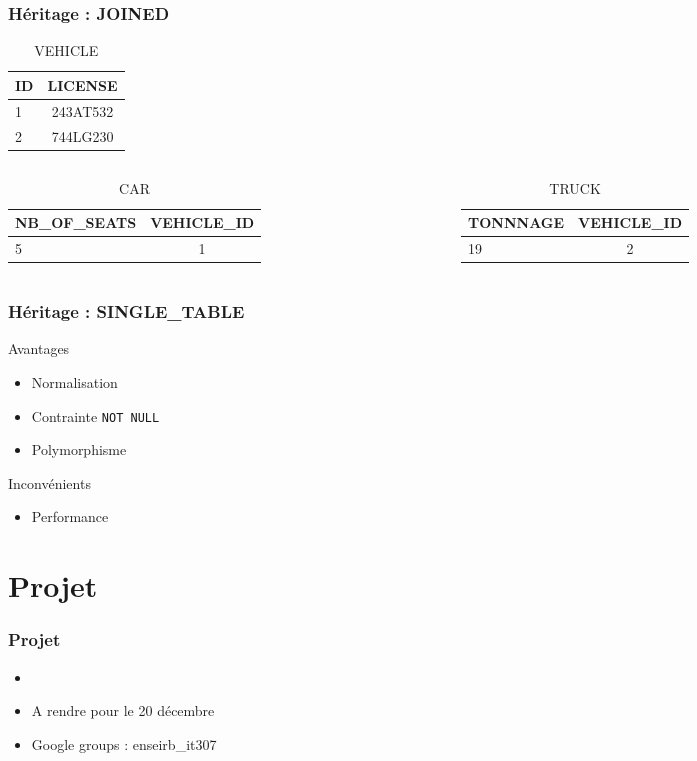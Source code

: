 \documentclass[t,12pt]{beamer}
\begin{document}
\begin{frame}
	\frametitle{H\'eritage : JOINED}

	\begin{table}
		\caption{VEHICLE}
		\begin{tabular}{l | c}
			ID & LICENSE \\
			\hline
			1 & 243AT532 \\
			2 & 744LG230 \\
		\end{tabular}
	\end{table}

	\begin{columns}
		\begin{column}{0.5\textwidth}
			\begin{table}
				\caption{CAR}
				\begin{tabular}{l | c }
					NB\_OF\_SEATS & VEHICLE\_ID \\
					\hline
					5 & 1
				\end{tabular}
		\end{table}
	\end{column}

		\begin{column}{0.5\textwidth}
			\begin{table}
				\caption{TRUCK}
				\begin{tabular}{l | c}
				TONNNAGE & VEHICLE\_ID \\
				\hline
				19 & 2
				\end{tabular}
			\end{table}
		\end{column}
	\end{columns}
\end{frame}

\begin{frame}
	\frametitle{H\'eritage : SINGLE\_TABLE}

	\begin{exampleblock}{Avantages}
		\begin{itemize}
			\item Normalisation
			\item Contrainte \lstinline{NOT NULL}
			\item Polymorphisme
		\end{itemize}
	\end{exampleblock}

	\begin{alertblock}{Inconv\'enients}
		\begin{itemize}
			\item Performance
		\end{itemize}
	\end{alertblock}
\end{frame}

\section{Projet}

\begin{frame}
	\frametitle{Projet}

	\begin{block}{}
		\begin{itemize}
			\item 
			\item A rendre pour le 20 d\'ecembre
			\item Google groups : enseirb\_it307
		\end{itemize}
	\end{block}
\end{frame}
\end{document}
